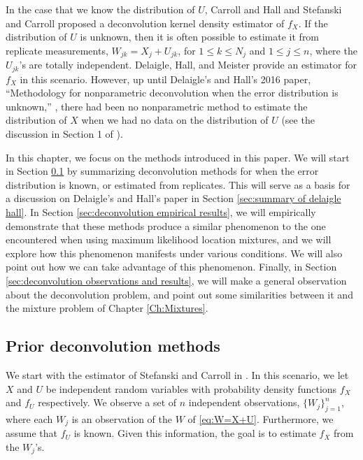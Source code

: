 	In the case that we know the distribution of $U$, Carroll and Hall \cite{Carroll1988-aj} and Stefanski and Carroll \cite{Stefanski1990-uo} proposed a deconvolution kernel density estimator of $f_X$. If the distribution of $U$ is unknown, then it is often possible to estimate it from replicate measurements, $W_{jk} = X_j + U_{jk}$, for $1 \leq k \leq N_j$ and $1 \leq j \leq n$, where the $U_{jk}$'s are totally independent. Delaigle, Hall, and Meister provide an estimator for $f_X$ in this scenario. However, up until Delaigle's and Hall's 2016 paper, ``Methodology for nonparametric deconvolution when the error distribution is unknown,'' \cite{Delaigle2016-la}, there had been no nonparametric method to estimate the distribution of $X$ when we had no data on the distribution of $U$ (see the discussion in Section 1 of \cite{Delaigle2016-la}).


	In this chapter, we focus on the methods introduced in this paper. We will start in Section \ref{sec:summary of basic deconvolution} by summarizing deconvolution methods for when the error distribution is known, or estimated from replicates. This will serve as a basis for a discussion on Delaigle's and Hall's \cite{Delaigle2016-la} paper in Section \ref{sec:summary of delaigle hall}. In Section \ref{sec:deconvolution empirical results}, we will empirically demonstrate that these methods produce a similar phenomenon to the one encountered when using maximum likelihood location mixtures, and we will explore how this phenomenon manifests under various conditions. We will also point out how we can take advantage of this phenomenon. 
	Finally, in Section \ref{sec:deconvolution observations and results}, we will make a general observation about the deconvolution problem, and point out some similarities between it and the mixture problem of Chapter \ref{Ch:Mixtures}.


\subsection{Prior deconvolution methods}
\label{sec:summary of basic deconvolution}
	We start with the estimator of Stefanski and Carroll in \cite{Stefanski1990-uo}. In this scenario, we let $X$ and $U$ be independent random variables with probability density functions $f_X$ and $f_U$ respectively. We observe a set of $n$ independent observations, $\{W_j\}_{j = 1}^n$, where each $W_j$ is an observation of the $W$ of \eqref{eq:W=X+U}.
	Furthermore, we assume that $f_U$ is known. Given this information, the goal is to estimate $f_X$ from the $W_j$'s.

